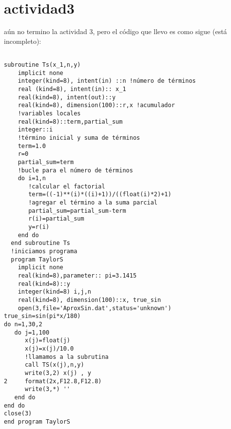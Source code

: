 \documentclass{article}
\begin{document}
\section{actividad3}
aún no termino la actividad 3, pero el código que llevo es como sigue (está incompleto):
\begin{verbatim}

subroutine Ts(x_1,n,y)
    implicit none
    integer(kind=8), intent(in) ::n !número de términos
    real (kind=8), intent(in):: x_1
    real(kind=8), intent(out)::y
    real(kind=8), dimension(100)::r,x !acumulador
    !variables locales
    real(kind=8)::term,partial_sum
    integer::i
    !término inicial y suma de términos
    term=1.0
    r=0
    partial_sum=term
    !bucle para el número de términos
    do i=1,n
       !calcular el factorial
       term=((-1)**(i)*((i)+1))/((float(i)*2)+1)
       !agregar el término a la suma parcial
       partial_sum=partial_sum-term
       r(i)=partial_sum
       y=r(i)
    end do
  end subroutine Ts
  !iniciamos programa
  program TaylorS
    implicit none
    real(kind=8),parameter:: pi=3.1415
    real(kind=8)::y
    integer(kind=8) i,j,n
    real(kind=8), dimension(100)::x, true_sin
    open(3,file='AproxSin.dat',status='unknown')
true_sin=sin(pi*x/180)
do n=1,30,2
   do j=1,100
      x(j)=float(j)
      x(j)=x(j)/10.0
      !llamamos a la subrutina
      call TS(x(j),n,y)
      write(3,2) x(j) , y
2     format(2x,F12.8,F12.8)
      write(3,*) ''
   end do
end do
close(3)
end program TaylorS


\end{verbatim}
\end{document}
